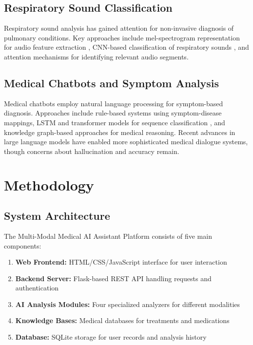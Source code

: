 \documentclass[conference]{IEEEtran}
\begin{document}
\subsection{Respiratory Sound Classification}

Respiratory sound analysis has gained attention for non-invasive diagnosis of pulmonary conditions. Key approaches include mel-spectrogram representation for audio feature extraction \cite{mcfee2015librosa}, CNN-based classification of respiratory sounds \cite{rocha2019open}, and attention mechanisms for identifying relevant audio segments.

\subsection{Medical Chatbots and Symptom Analysis}

Medical chatbots employ natural language processing for symptom-based diagnosis. Approaches include rule-based systems using symptom-disease mappings, LSTM and transformer models for sequence classification \cite{hochreiter1997long}, and knowledge graph-based approaches for medical reasoning. Recent advances in large language models have enabled more sophisticated medical dialogue systems, though concerns about hallucination and accuracy remain.

\section{Methodology}

\subsection{System Architecture}

The Multi-Modal Medical AI Assistant Platform consists of five main components:

\begin{enumerate}
\item \textbf{Web Frontend:} HTML/CSS/JavaScript interface for user interaction
\item \textbf{Backend Server:} Flask-based REST API handling requests and authentication
\item \textbf{AI Analysis Modules:} Four specialized analyzers for different modalities
\item \textbf{Knowledge Bases:} Medical databases for treatments and medications
\item \textbf{Database:} SQLite storage for user records and analysis history
\end{enumerate}
\end{document}
